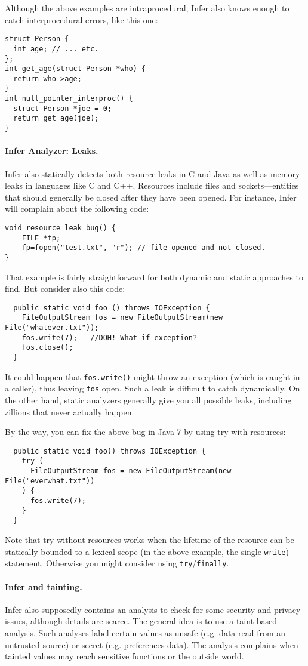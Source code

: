 \documentclass[11pt]{article}
\begin{document}
\newpage Although the above examples are intraprocedural, Infer also knows enough 
to catch interprocedural errors, like this one:
\begin{lstlisting}
struct Person {
  int age; // ... etc.
};
int get_age(struct Person *who) {
  return who->age;
}
int null_pointer_interproc() {
  struct Person *joe = 0;
  return get_age(joe);
}
\end{lstlisting}

\paragraph{Infer Analyzer: Leaks.} 
Infer also statically detects both resource leaks in C and Java as well as 
memory leaks in languages like C and C++. Resources include files and 
sockets---entities that should generally be closed after they have been opened.
For instance, Infer will complain about the following code:
\begin{lstlisting}
void resource_leak_bug() {
    FILE *fp;
    fp=fopen("test.txt", "r"); // file opened and not closed.
}
\end{lstlisting}
That example is fairly straightforward for both dynamic and static approaches
to find. But consider also this code:
\begin{lstlisting}
  public static void foo () throws IOException {
    FileOutputStream fos = new FileOutputStream(new File("whatever.txt"));
    fos.write(7);   //DOH! What if exception?
    fos.close();
  }
\end{lstlisting}
It could happen that {\tt fos.write()} might throw an exception (which is caught 
in a caller), thus leaving {\tt fos} open. Such a leak is difficult to catch dynamically.
On the other hand, static analyzers generally give you all possible leaks, including
zillions that never actually happen.

By the way, you can fix the above bug in Java 7 by using try-with-resources:
\begin{lstlisting}
  public static void foo() throws IOException {
    try (
      FileOutputStream fos = new FileOutputStream(new File("everwhat.txt"))
    ) {
      fos.write(7);
    }
  }
\end{lstlisting}
Note that try-without-resources works when the lifetime of the resource can be statically
bounded to a lexical scope (in the above example, the single {\tt write}) statement.
Otherwise you might consider using {\tt try}/{\tt finally}.

\paragraph{Infer and tainting.}
Infer also supposedly contains an analysis to check for some security and privacy issues, although
details are scarce. The general idea is to use a taint-based analysis. Such analyses label certain
values as unsafe (e.g. data read from an untrusted source) or secret (e.g. preferences data).
The analysis complains when tainted values may reach sensitive functions or the outside world.
\end{document}
